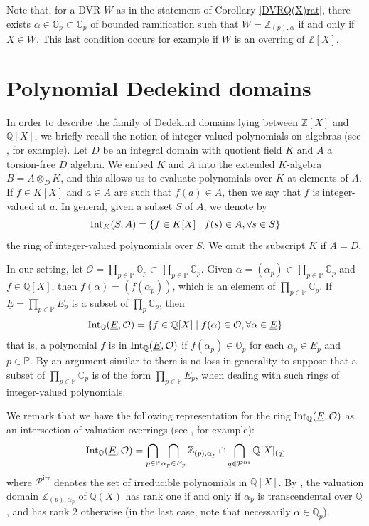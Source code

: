 \documentclass[10pt]{article}
\numberwithin{equation}{section}
\theoremstyle{definition}\newtheorem{Def}[equation]{Definition}
\theoremstyle{definition}\newtheorem{Ques}[equation]{Question}
\newcommand{\Q}{\mathbb{Q}}
\newcommand{\Z}{\mathbb{Z}}
\renewcommand{\O}{\mathbb{O}}
\newcommand{\C}{\mathbb{C}}
\newcommand{\PP}{\mathbb{P}}
\newcommand{\Int}{\textnormal{Int}}
\newcommand{\IntQ}{\Int_{\Q}}
\newcommand{\uE}{\underline{E}}
\newcommand{\oQp}{\overline{\Q_p}}
\begin{document}
Note that, for a DVR $W$ as in the statement of Corollary \ref{DVRQ(X)rat}, there exists $\alpha\in \O_p\subset\C_p$ of bounded ramification such that $W=\Z_{(p),\alpha}$ if and only if $X\in W$. This last  condition occurs for example if $W$ is an overring of $\Z[X]$.


\vskip1cm
\section{Polynomial Dedekind domains}\label{PolDed}
In order to describe the family of Dedekind domains lying between $\Z[X]$ and $\Q[X]$,  we briefly recall the notion of integer-valued polynomials on algebras (see \cite{ChabPer, PerWerNontrivial}, for example). Let $D$ be an integral domain with quotient field $K$ and $A$ a torsion-free $D$ algebra. We embed $K$ and $A$ into the extended $K$-algebra $B=A\otimes_D K$, and this allows us to evaluate  polynomials over $K$ at elements of $A$. If $f\in K[X]$ and $a\in A$ are such that $f(a)\in A$, then we say that $f$ is integer-valued at $a$. In general, given a subset $S$ of $A$, we denote by
$$\Int_K(S,A)=\{f\in K[X] \mid f(s)\in A,\forall s\in S\}$$
the ring of integer-valued polynomials over $S$. We omit the subscript $K$ if $A=D$.

In our setting, let $\mathcal{O}=\prod_{p\in\PP}\O_p\subset\prod_{p\in\PP}\C_p$. Given $\alpha=(\alpha_p)\in  \prod_{p\in\PP}\C_p$ and $f\in\Q[X]$, then $f(\alpha)=(f(\alpha_p))$, which  is an element of $\prod_{p\in\PP}\C_p$. If $\uE=\prod_{p\in\PP}E_p$ is a subset of $\prod_p \C_p$, then
$$\IntQ(\uE,\mathcal{O})=\{f\in\Q[X]\mid f(\alpha)\in\mathcal{O},\forall \alpha\in\uE\}$$
that is, a polynomial $f$ is in $\IntQ(\uE,\mathcal{O})$ if $f(\alpha_p)\in \O_p$ for each $\alpha_p\in E_p$ and $p\in\PP$. By an argument similar to \cite[Remark 6.3]{ChabPer} there is no loss in generality to suppose that a subset of $\prod_{p\in\PP}\C_p$ is of the form $\prod_{p\in\PP}E_p$, when dealing with such rings of integer-valued polynomials.

We remark that we have the following representation for the ring $\IntQ(\uE,\mathcal{O})$ as an intersection of valuation overrings (see \cite[(2.2)]{PerDedekind}, for example):
\begin{equation}\label{IntQEZrepr}
\IntQ(\uE,\mathcal O)=\bigcap_{p\in\PP}\bigcap_{\alpha_p\in E_p}\Z_{(p),\alpha_p}\cap\bigcap_{q\in\mathcal{P}^{\text{irr}}}\Q[X]_{(q)}
\end{equation}
where  $\mathcal{P}^{\text{irr}}$ denotes the set of irreducible polynomials in $\Q[X]$. By \cite[Proposition 2.2]{PerTransc}, the valuation domain $\Z_{(p),\alpha_p}$ of $\Q(X)$ has rank one if and only if $\alpha_p$ is transcendental over $\Q$, and has rank $2$ otherwise (in the last case, note that necessarily $\alpha\in\oQp$).
\end{document}
